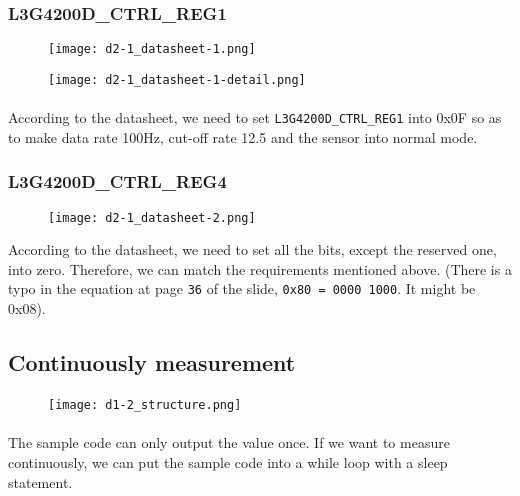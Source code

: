 \subsubsection{L3G4200D\_CTRL\_REG1}
\begin{figure}[!h]
    \begin{center} 
        \texttt{[image: d2-1\_datasheet-1.png]} 
    \end{center} 
\end{figure} 
\begin{figure}[!h]
    \begin{center} 
        \texttt{[image: d2-1\_datasheet-1-detail.png]} 
    \end{center} 
\end{figure} 
\paragraph{}
According to the datasheet, we need to set \texttt{L3G4200D\_CTRL\_REG1} into 0x0F so as to make data rate 100Hz, cut-off rate 12.5 and the sensor into normal mode.
\subsubsection{L3G4200D\_CTRL\_REG4}
\begin{figure}[!h]
    \begin{center} 
        \texttt{[image: d2-1\_datasheet-2.png]} 
    \end{center} 
\end{figure}
According to the datasheet, we need to set all the bits, except the reserved one, into zero. Therefore, we can match the requirements mentioned above. (There is a typo in the equation at page \texttt{36} of the slide, \texttt{0x80 = 0000 1000}. It might be 0x08).
\newpage
\subsection{Continuously measurement}
\paragraph{}
\begin{figure}[!h]
    \begin{center} 
        \texttt{[image: d1-2\_structure.png]} 
    \end{center} 
\end{figure} 
\paragraph{}
The sample code can only output the value once. If we want to measure continuously, we can put the sample code into a while loop with a sleep statement.
